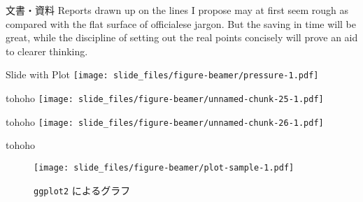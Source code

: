 \documentclass[
  ignorenonframetext,
]{beamer}
\begin{document}
\begin{frame}{文書・資料}
\protect\hypertarget{ux6587ux66f8ux8cc7ux6599-2}{}
Reports drawn up on the lines I propose may at first seem rough as
compared with the flat surface of officialese jargon. But the saving in
time will be great, while the discipline of setting out the real points
concisely will prove an aid to clearer thinking.
\end{frame}

\begin{frame}{Slide with Plot}
\protect\hypertarget{slide-with-plot}{}
\texttt{[image: slide\_files/figure-beamer/pressure-1.pdf]}
\end{frame}

\begin{frame}{tohoho}
\protect\hypertarget{tohoho}{}
\texttt{[image: slide\_files/figure-beamer/unnamed-chunk-25-1.pdf]}
\end{frame}

\begin{frame}{tohoho}
\protect\hypertarget{tohoho-1}{}
\texttt{[image: slide\_files/figure-beamer/unnamed-chunk-26-1.pdf]}
\end{frame}

\begin{frame}[fragile]{tohoho}
\protect\hypertarget{tohoho-2}{}
\begin{figure}
\centering
\texttt{[image: slide\_files/figure-beamer/plot-sample-1.pdf]}
\caption{\texttt{ggplot2} によるグラフ}
\end{figure}
\end{frame}
\end{document}
